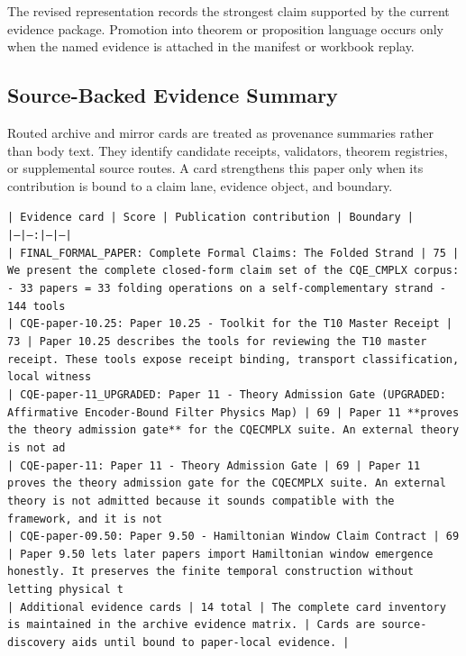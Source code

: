 \documentclass[11pt]{article}
\begin{document}
The revised representation records the strongest claim supported by the current evidence package. Promotion into theorem or proposition language occurs only when the named evidence is attached in the manifest or workbook replay.

\subsection*{Source-Backed Evidence Summary}

Routed archive and mirror cards are treated as provenance summaries rather than
body text. They identify candidate receipts, validators, theorem registries, or
supplemental source routes. A card strengthens this paper only when its
contribution is bound to a claim lane, evidence object, and boundary.

\noindent\texttt{| Evidence card | Score | Publication contribution | Boundary |}\\
\noindent\texttt{|---|---:|---|---|}\\
\noindent\texttt{| FINAL\_FORMAL\_PAPER: Complete Formal Claims: The Folded Strand | 75 | We present the complete closed-form claim set of the CQE\_CMPLX corpus: - 33 papers = 33 folding operations on a self-complementary strand - 144 tools}\\
\noindent\texttt{| CQE-paper-10.25: Paper 10.25 - Toolkit for the T10 Master Receipt | 73 | Paper 10.25 describes the tools for reviewing the T10 master receipt. These tools expose receipt binding, transport classification, local witness}\\
\noindent\texttt{| CQE-paper-11\_UPGRADED: Paper 11 - Theory Admission Gate (UPGRADED: Affirmative Encoder-Bound Filter Physics Map) | 69 | Paper 11 **proves the theory admission gate** for the CQECMPLX suite. An external theory is not ad}\\
\noindent\texttt{| CQE-paper-11: Paper 11 - Theory Admission Gate | 69 | Paper 11 proves the theory admission gate for the CQECMPLX suite. An external theory is not admitted because it sounds compatible with the framework, and it is not }\\
\noindent\texttt{| CQE-paper-09.50: Paper 9.50 - Hamiltonian Window Claim Contract | 69 | Paper 9.50 lets later papers import Hamiltonian window emergence honestly. It preserves the finite temporal construction without letting physical t}\\
\noindent\texttt{| Additional evidence cards | 14 total | The complete card inventory is maintained in the archive evidence matrix. | Cards are source-discovery aids until bound to paper-local evidence. |}\\
\end{document}
